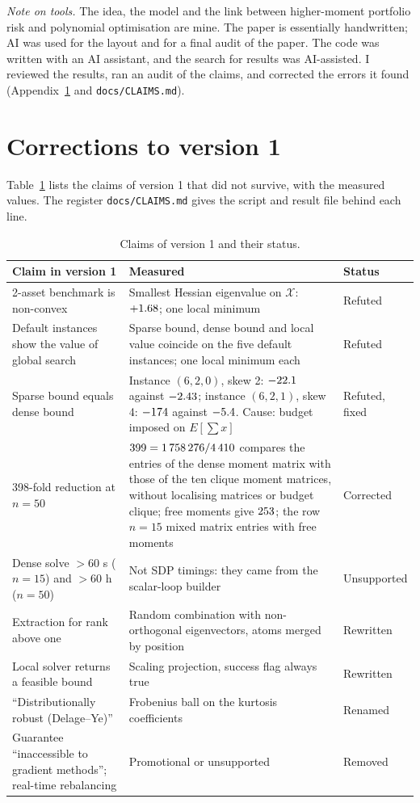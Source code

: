 \documentclass[11pt,a4paper]{article}
\begin{document}
\medskip\noindent\emph{Note on tools.}
The idea, the model and the link between higher-moment portfolio risk and polynomial optimisation are mine.
The paper is essentially handwritten; AI was used for the layout and for a final audit of the paper. The code was written with an AI assistant, and the search for results was AI-assisted.
I reviewed the results, ran an audit of the claims, and corrected the errors it found (Appendix~\ref{app:v1} and \texttt{docs/CLAIMS.md}).




\appendix
\section{Corrections to version 1}\label{app:v1}
Table~\ref{tab:v1} lists the claims of version 1 that did not survive, with the measured values.
The register \texttt{docs/CLAIMS.md} gives the script and result file behind each line.
\begin{table}[h]
\centering\small
\caption{Claims of version 1 and their status.}\label{tab:v1}
\begin{tabular}{p{4.6cm}p{7.4cm}p{2.2cm}}
\toprule
Claim in version 1 & Measured & Status\\
\midrule
2-asset benchmark is non-convex & Smallest Hessian eigenvalue on $\mathcal{X}$: $+1.68$; one local minimum & Refuted\\
Default instances show the value of global search & Sparse bound, dense bound and local value coincide on the five default instances; one local minimum each & Refuted\\
Sparse bound equals dense bound & Instance $(6,2,0)$, skew 2: $-22.1$ against $-2.43$; instance $(6,2,1)$, skew 4: $-174$ against $-5.4$. Cause: budget imposed on $E[\sum x]$ & Refuted, fixed\\
398-fold reduction at $n=50$ & $399=1\,758\,276/4\,410$ compares the entries of the dense moment matrix with those of the ten clique moment matrices, without localising matrices or budget clique; free moments give $253$; the row $n=15$ mixed matrix entries with free moments & Corrected\\
Dense solve $>60$ s ($n=15$) and $>60$ h ($n=50$) & Not SDP timings: they came from the scalar-loop builder & Unsupported\\
Extraction for rank above one & Random combination with non-orthogonal eigenvectors, atoms merged by position & Rewritten\\
Local solver returns a feasible bound & Scaling projection, success flag always true & Rewritten\\
``Distributionally robust (Delage--Ye)'' & Frobenius ball on the kurtosis coefficients & Renamed\\
Guarantee ``inaccessible to gradient methods''; real-time rebalancing & Promotional or unsupported & Removed\\
\bottomrule
\end{tabular}
\end{table}
\end{document}
